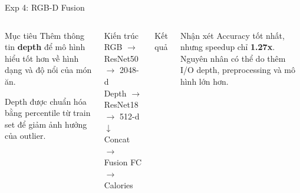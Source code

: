 \documentclass[10pt,aspectratio=169]{beamer}
\newcommand{\highlight}[1]{\textcolor{accent}{\bfseries #1}}
\newcommand{\kw}[1]{\textcolor{uitblue}{\bfseries #1}}
\begin{document}
\begin{frame}{Exp 4: RGB-D Fusion}
\scriptsize
\begin{columns}[T]
\begin{uitbox}{Mục tiêu}
Thêm thông tin \kw{depth} để mô hình hiểu tốt hơn về hình dạng và độ nổi của món ăn.

\vspace{0.08cm}
Depth được chuẩn hóa bằng percentile từ train set để giảm ảnh hưởng của outlier.
\end{uitbox}

\vspace{0.12cm}
\begin{accentbox}{Kiến trúc}
\centering
RGB $\rightarrow$ ResNet50 $\rightarrow$ 2048-d\\
Depth $\rightarrow$ ResNet18 $\rightarrow$ 512-d\\
$\downarrow$\\
Concat $\rightarrow$ Fusion FC $\rightarrow$ Calories
\end{accentbox}

\begin{greenbox}{Kết quả}
\centering
{}
\end{greenbox}
\vspace{0.1cm}
\begin{redbox}{Nhận xét}
Accuracy tốt nhất, nhưng speedup chỉ \highlight{1.27x}. Nguyên nhân có thể do thêm I/O depth, preprocessing và mô hình lớn hơn.
\end{redbox}
\end{columns}
\end{frame}
\end{document}
